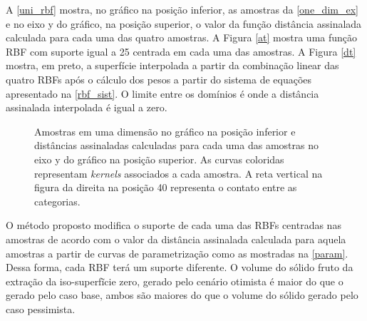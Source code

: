 A \autoref{uni_rbf} mostra, no gráfico na posição inferior, as amostras da \autoref{one_dim_ex} e no eixo y do gráfico, na posição superior, o valor da função distância assinalada calculada para cada uma das quatro amostras. A Figura \autoref{at} mostra uma função RBF com suporte igual a 25 centrada em cada uma das amostras. A Figura \autoref{dt} mostra, em preto, a superfície interpolada a partir da combinação linear das quatro RBFs após o cálculo dos pesos a partir do sistema de equações apresentado na \autoref{rbf_sist}. O limite entre os domínios é onde a distância assinalada interpolada é igual a zero.

\begin{figure}[H] 
    \centering
    \caption{Amostras em uma dimensão no gráfico na posição inferior e distâncias assinaladas calculadas para cada uma das amostras no eixo y do gráfico na posição superior. As curvas coloridas representam \textit{kernels} associados a cada amostra. A reta vertical na figura da direita na posição 40 representa o contato entre as categorias.} \label{uni_rbf}
     \hspace{1em}
\end{figure}

O método proposto modifica o suporte de cada uma das RBFs centradas nas amostras de acordo com o valor da distância assinalada calculada para aquela amostras a partir de curvas de parametrização como as mostradas na \autoref{param}. Dessa forma, cada RBF terá um suporte diferente. O volume do sólido fruto da extração da iso-superfĩcie zero, gerado pelo cenário otimista é maior do que o gerado pelo caso base, ambos são maiores do que o volume do sólido gerado pelo caso pessimista.

